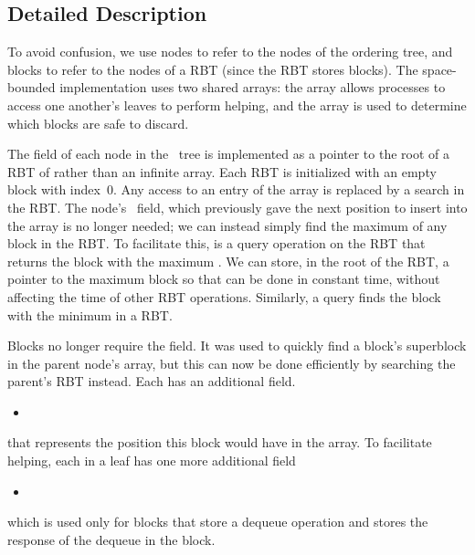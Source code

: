 
\subsection{Detailed Description}
\label{reducing-details}


\renewcommand{\algorithmiccomment}[1]{\hfill\eqparbox{COMMENTSINGLEAPP}{\com\ #1}}

To avoid confusion, we use nodes to refer to the nodes of the ordering tree, and blocks to refer
to the nodes of a RBT (since the RBT stores blocks).
The space-bounded implementation uses two  shared arrays:
the  array allows processes to access one another's leaves to perform helping, and
the  array is used to determine which blocks are safe to discard.

The  field of each node in the \ordering\ tree is implemented as a pointer to the root of a RBT of  rather than an infinite array.  
Each RBT is initialized with an empty block with index~0.
Any access to an entry of the  array is replaced by a search in the RBT.
The node's \head\ field, which previously gave the next position to insert into the  array is no
longer needed; we can instead simply find the maximum  of any block in the RBT.
To facilitate this,  is a query operation on the RBT that 
returns the block with the maximum .
We can store, in the root of the RBT, a pointer to the maximum block so that 
can be done in constant time, without affecting the time of other RBT operations.
Similarly, a  query finds the block with the minimum  in a RBT.

Blocks no longer require the  field.  It was used to quickly find a block's 
superblock in the parent node's  array, but this can now be done efficiently 
by searching the parent's  RBT instead.
Each  has an additional field.
\begin{itemize}
\item {}  
\end{itemize}
that represents the position this block would have in the  array.
To facilitate helping, each  in a leaf has one more additional field 
\begin{itemize}
\item {} 
\end{itemize}
which is used only for blocks that store a dequeue operation and stores the response of the dequeue in the block.


